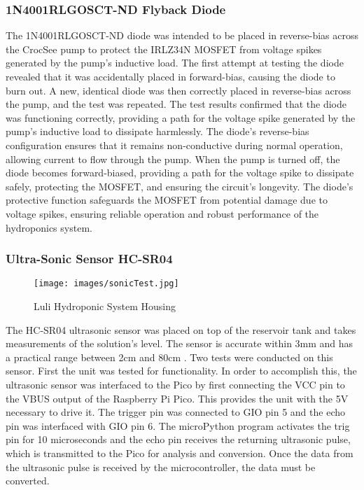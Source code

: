 \documentclass[12pt]{article} %
\begin{document}
\subsubsection{1N4001RLGOSCT-ND Flyback Diode}
\noindent The 1N4001RLGOSCT-ND \cite{ref_diode} diode was intended to be placed in reverse-bias across the CrocSee pump to protect the IRLZ34N MOSFET from voltage spikes generated by the pump's inductive load. The first attempt at testing the diode revealed that it was accidentally placed in forward-bias, causing the diode to burn out. A new, identical diode was then correctly placed in reverse-bias across the pump, and the test was repeated. The test results confirmed that the diode was functioning correctly, providing a path for the voltage spike generated by the pump's inductive load to dissipate harmlessly. The diode's reverse-bias configuration ensures that it remains non-conductive during normal operation, allowing current to flow through the pump. When the pump is turned off, the diode becomes forward-biased, providing a path for the voltage spike to dissipate safely, protecting the MOSFET, and ensuring the circuit's longevity. The diode's protective function safeguards the MOSFET from potential damage due to voltage spikes, ensuring reliable operation and robust performance of the hydroponics system.

\subsubsection{Ultra-Sonic Sensor HC-SR04}
\begin{figure}[H]
  \centering
  \texttt{[image: images/sonicTest.jpg]}
  \caption{Luli Hydroponic System Housing}
  \label{fig:HCSR04 Test Circuit}
\end{figure}

\pagebreak

\noindent The HC-SR04 ultrasonic sensor was placed on top of the reservoir tank and takes measurements of the solution’s level. The sensor is accurate within 3mm and has a practical range between 2cm and 80cm \cite{ref_hcsr04}. Two tests were conducted on this sensor. First the unit was tested for functionality. In order to accomplish this, the ultrasonic sensor was interfaced to the Pico by first connecting the VCC pin to the VBUS output of the Raspberry Pi Pico. This provides the unit with the 5V necessary to drive it. The trigger pin was connected to GIO pin 5 and the echo pin was interfaced with GIO pin 6. The microPython program activates the trig pin for 10 microseconds and the echo pin receives the returning ultrasonic pulse, which is transmitted to the Pico for analysis and conversion. Once the data from the ultrasonic pulse is received by the microcontroller, the data must be converted.
\end{document}
